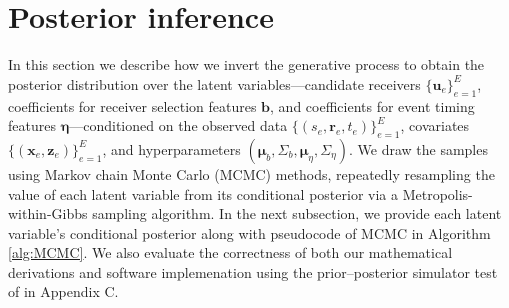 \documentclass[ba]{imsart}
\numberwithin{equation}{section}
\theoremstyle{plain}
\begin{document}
		
	\section{Posterior inference}\label{sec:inference}
	In this section we describe how we invert the generative process to obtain the posterior distribution over the latent variables---candidate receivers $\{\boldsymbol{u}_e\}_{e=1}^E$, coefficients for receiver selection features $\boldsymbol{b}$, and coefficients for event timing features $\boldsymbol{\eta}$---conditioned on the observed data $\{(s_e, \boldsymbol{r}_e, t_e)\}_{e=1}^E$, covariates $\{(\boldsymbol{x}_e, \boldsymbol{z}_e)\}_{e=1}^E$, and hyperparameters $(\boldsymbol{\mu}_b, \Sigma_b, \boldsymbol{\mu}_\eta, \Sigma_\eta)$. We draw the samples using Markov chain Monte Carlo (MCMC) methods, repeatedly resampling the value of each latent variable from its conditional posterior via a Metropolis-within-Gibbs sampling algorithm. In the next subsection, we provide each latent variable's conditional posterior along with pseudocode of MCMC in Algorithm \ref{alg:MCMC}. We also evaluate the correctness of both our mathematical derivations and software implemenation using the prior--posterior simulator test of \cite{geweke2004getting} in Appendix C.
	
\end{document}
